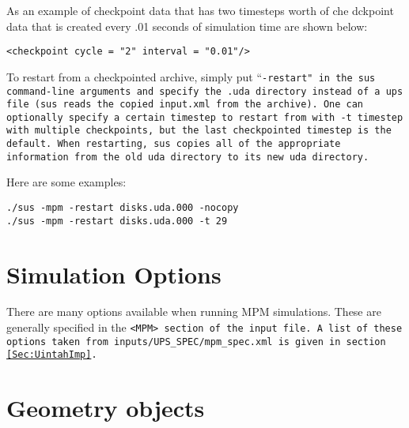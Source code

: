 As an example of checkpoint data that has two timesteps worth of
che dckpoint data that is created every .01 seconds of simulation time
are shown below:

\begin{Verbatim}[fontsize=\footnotesize]
<checkpoint cycle = "2" interval = "0.01"/>
\end{Verbatim}

To restart from a checkpointed archive, simply put ``\tt -restart\normalfont" in the
sus command-line arguments and specify the .uda directory instead of
a ups file (sus reads the copied \tt input.xml \normalfont from the
archive).  One can optionally specify a certain timestep to restart
from with \tt -t timestep \normalfont with multiple checkpoints, but the
last checkpointed timestep is the default.  When restarting, sus
copies all of the appropriate information from the old uda directory to its
new uda directory.

Here are some examples:

\begin{Verbatim}[fontsize=\footnotesize]
./sus -mpm -restart disks.uda.000 -nocopy
./sus -mpm -restart disks.uda.000 -t 29
\end{Verbatim}
%

\section{Simulation Options} \label{Sec:SimulationOptions}


There are many options available when running MPM simulations.  These
are generally specified in the \tt <MPM> \normalfont section of the input file.
A list of these options taken from 
\tt inputs/UPS\_SPEC/mpm\_spec.xml \normalfont  is given in section \ref{Sec:UintahImp}.

\section{Geometry objects} \label{Sec:GeometryObjects}

